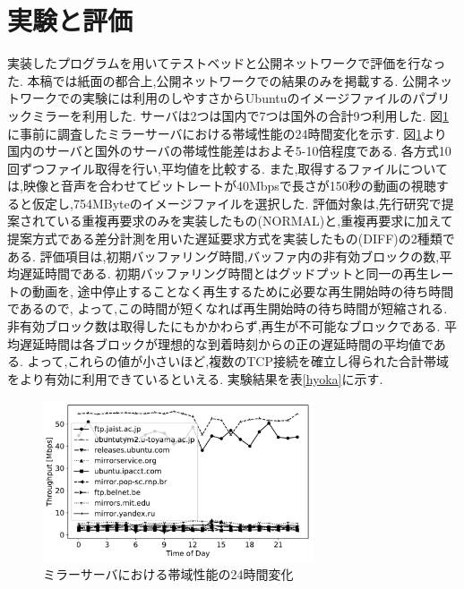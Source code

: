 \documentclass{ltjsarticle}
\begin{document}
\section{実験と評価}
\vspace{-3mm}
実装したプログラムを用いてテストベッドと公開ネットワークで評価を行なった.
本稿では紙面の都合上,公開ネットワークでの結果のみを掲載する.
公開ネットワークでの実験には利用のしやすさからUbuntuのイメージファイルのパブリックミラーを利用した.
サーバは2つは国内で7つは国外の合計9つ利用した.
図\ref{mirror}に事前に調査したミラーサーバにおける帯域性能の24時間変化を示す.
図\ref{mirror}より国内のサーバと国外のサーバの帯域性能差はおよそ5-10倍程度である.
各方式10回ずつファイル取得を行い,平均値を比較する.
また,取得するファイルについては,映像と音声を合わせてビットレートが40Mbpsで長さが150秒の動画の視聴すると仮定し,754MByteのイメージファイルを選択した.
評価対象は,先行研究で提案されている重複再要求のみを実装したもの(NORMAL)と,重複再要求に加えて提案方式である差分計測を用いた遅延要求方式を実装したもの(DIFF)の2種類である.
評価項目は,初期バッファリング時間,バッファ内の非有効ブロックの数,平均遅延時間である.
初期バッファリング時間とはグッドプットと同一の再生レートの動画を,
途中停止することなく再生するために必要な再生開始時の待ち時間であるので,
よって,この時間が短くなれば再生開始時の待ち時間が短縮される.
非有効ブロック数は取得したにもかかわらず,再生が不可能なブロックである.
平均遅延時間は各ブロックが理想的な到着時刻からの正の遅延時間の平均値である.
よって,これらの値が小さいほど,複数のTCP接続を確立し得られた合計帯域をより有効に利用できているといえる.
実験結果を表\ref{hyoka}に示す.
\vspace{-7.5mm}
\begin{table}[htb]
	\begin{center}
		\caption{実験結果}
		\label{hyoka}
		\vspace{-0.25mm}
	\end{center}
\end{table}
\vspace{-11mm}
\begin{figure}[h]
	\centering
	\includegraphics[width=8cm]{figure/thp24h-g.pdf}
	\vspace{-5.5mm}
	\caption{ミラーサーバにおける帯域性能の24時間変化}
	\label{mirror}
\end{figure}
\vspace{-4.5mm}
\end{document}

